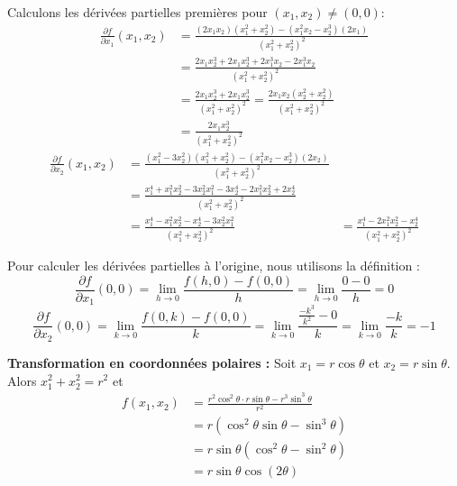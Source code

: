 \documentclass{article}
\begin{document}
Calculons les dérivées partielles premières pour $(x_1, x_2) \neq (0,0)$:
\begin{align*}
    \frac{\partial f}{\partial x_1}(x_1, x_2) &= \frac{(2x_1 x_2)(x_1^2 + x_2^2) - (x_1^2 x_2 - x_2^3)(2x_1)}{(x_1^2 + x_2^2)^2} \\
    &= \frac{2x_1 x_2^3 + 2x_1 x_2^3 + 2x_1^3 x_2 - 2x_1^3 x_2}{(x_1^2 + x_2^2)^2} \\
    &= \frac{2x_1 x_2^3 + 2x_1 x_2^3}{(x_1^2 + x_2^2)^2} = \frac{2x_1 x_2 (x_2^2 + x_2^2)}{(x_1^2 + x_2^2)^2} \\ %
    &= \frac{2x_1 x_2^3}{(x_1^2 + x_2^2)^2}
\end{align*}
\begin{align*}
    \frac{\partial f}{\partial x_2}(x_1, x_2) &= \frac{(x_1^2 - 3x_2^2)(x_1^2 + x_2^2) - (x_1^2 x_2 - x_2^3)(2x_2)}{(x_1^2 + x_2^2)^2} \\
    &= \frac{x_1^4 + x_1^2 x_2^2 - 3x_2^2 x_1^2 - 3x_2^4 - 2x_1^2 x_2^2 + 2x_2^4}{(x_1^2 + x_2^2)^2} \\
    &= \frac{x_1^4 - x_1^2 x_2^2 - x_2^4 - 3x_2^2 x_1^2}{(x_1^2 + x_2^2)^2} %
    &= \frac{x_1^4 - 2x_1^2 x_2^2 - x_2^4}{(x_1^2 + x_2^2)^2}
\end{align*}

Pour calculer les dérivées partielles à l'origine, nous utilisons la définition :
\[ \frac{\partial f}{\partial x_1}(0, 0) = \lim_{h \to 0} \frac{f(h, 0) - f(0, 0)}{h} = \lim_{h \to 0} \frac{0 - 0}{h} = 0 \]
\[ \frac{\partial f}{\partial x_2}(0, 0) = \lim_{k \to 0} \frac{f(0, k) - f(0, 0)}{k} = \lim_{k \to 0} \frac{\frac{-k^3}{k^2} - 0}{k} = \lim_{k \to 0} \frac{-k}{k} = -1 \]

\textbf{Transformation en coordonnées polaires :}
Soit $x_1 = r \cos \theta$ et $x_2 = r \sin \theta$. Alors $x_1^2 + x_2^2 = r^2$ et
\begin{align*}
    f(x_1, x_2) &= \frac{r^2 \cos^2 \theta \cdot r \sin \theta - r^3 \sin^3 \theta}{r^2} \\
    &= r (\cos^2 \theta \sin \theta - \sin^3 \theta) \\
    &= r \sin \theta (\cos^2 \theta - \sin^2 \theta) \\
    &= r \sin \theta \cos (2\theta)
\end{align*}
\end{document}
